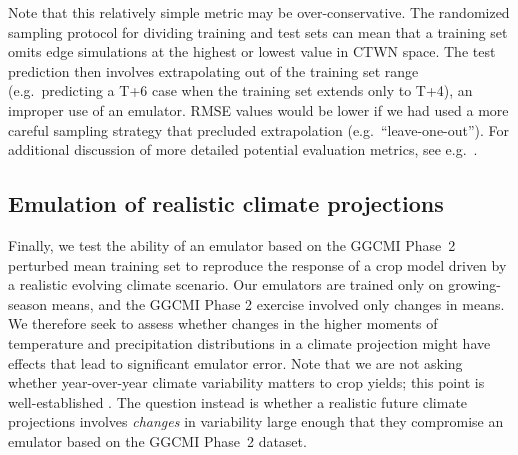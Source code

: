 \documentclass[gmdd]{copernicus} %
\begin{document}
Note that this relatively simple metric may be over-conservative.
The randomized sampling protocol for dividing training and test sets can mean that a training set omits edge simulations at the highest or lowest value in CTWN space. 
The test prediction then involves extrapolating out of the training set range (e.g.\ predicting a T+6 case when the training set extends only to T+4), an improper use of an emulator. 
RMSE values would be lower if we had used a more careful sampling strategy that precluded extrapolation (e.g.\ ``leave-one-out''). 
For additional discussion of more detailed potential evaluation metrics, see e.g.\ \citet{Castruccio14}.

\smallskip
\label{S:4.3}
\subsection{Emulation of realistic climate projections}
Finally, we test the ability of an emulator based on the GGCMI Phase~2 perturbed mean training set to reproduce the response of a crop model driven by a realistic evolving climate scenario. 
Our emulators are trained only on growing-season means, and the GGCMI Phase 2 exercise involved only changes in means. We therefore seek to assess whether changes in the higher moments of temperature and precipitation distributions in a climate projection might have effects that lead to significant emulator error. Note that we are not asking whether year-over-year climate variability matters to crop yields; this point is well-established \citep{ray_climate_2015}. The question instead is whether a realistic future climate projections involves {\it changes} in variability large enough that they compromise an emulator based on the GGCMI Phase~2 dataset. 
 
\end{document}
